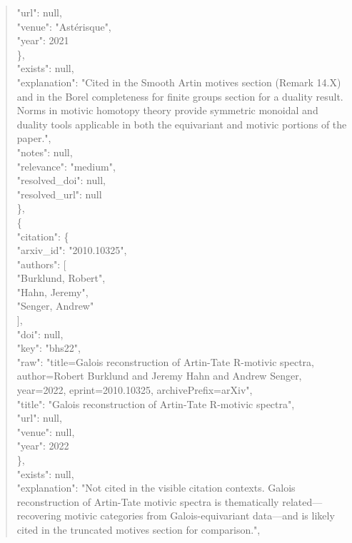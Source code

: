 \documentclass[11pt]{article}
\begin{document}
\begin{quote}
        "url": null,\\
        "venue": "Astérisque",\\
        "year": 2021\\
      \},\\
      "exists": null,\\
      "explanation": "Cited in the Smooth Artin motives section (Remark 14.X) and in the Borel completeness for finite groups section for a duality result. Norms in motivic homotopy theory provide symmetric monoidal and duality tools applicable in both the equivariant and motivic portions of the paper.",\\
      "notes": null,\\
      "relevance": "medium",\\
      "resolved\_doi": null,\\
      "resolved\_url": null\\
    \},\\
    \{\\
      "citation": \{\\
        "arxiv\_id": "2010.10325",\\
        "authors": [\\
          "Burklund, Robert",\\
          "Hahn, Jeremy",\\
          "Senger, Andrew"\\
        ],\\
        "doi": null,\\
        "key": "bhs22",\\
        "raw": "title=Galois reconstruction of Artin-Tate R-motivic spectra, author=Robert Burklund and Jeremy Hahn and Andrew Senger, year=2022, eprint=2010.10325, archivePrefix=arXiv",\\
        "title": "Galois reconstruction of Artin-Tate R-motivic spectra",\\
        "url": null,\\
        "venue": null,\\
        "year": 2022\\
      \},\\
      "exists": null,\\
      "explanation": "Not cited in the visible citation contexts. Galois reconstruction of Artin-Tate motivic spectra is thematically related---recovering motivic categories from Galois-equivariant data---and is likely cited in the truncated motives section for comparison.",\\

\end{quote}
\end{document}
